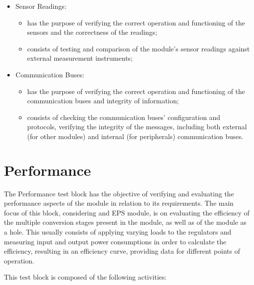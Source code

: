 \begin{itemize}
    \item Sensor Readings:
    \begin{itemize}
        \item has the purpose of verifying the correct operation and functioning of the sensors and the correctness of the readings;
        \item consists of testing and comparison of the module's sensor readings against external measurement instruments;
    \end{itemize}

    \item Communication Buses:
    \begin{itemize}
        \item has the purpose of verifying the correct operation and functioning of the communication buses and integrity of information;
        \item consists of checking the communication buses' configuration and protocols, verifying the integrity of the messages, including both external (for other modules) and internal (for peripherals) communication buses.
    \end{itemize}
\end{itemize}





\section{Performance}

The Performance test block has the objective of verifying and evaluating the performance aspects of the module in relation to its requirements.
The main focus of this block, considering and EPS module, is on evaluating the efficiency of the multiple conversion stages present in the module, as well as of the module as a hole.
This usually consists of applying varying loads to the regulators and measuring input and output power consumptions in order to calculate the efficiency, resulting in an efficiency curve, providing data for different points of operation.

This test block is composed of the following activities:

